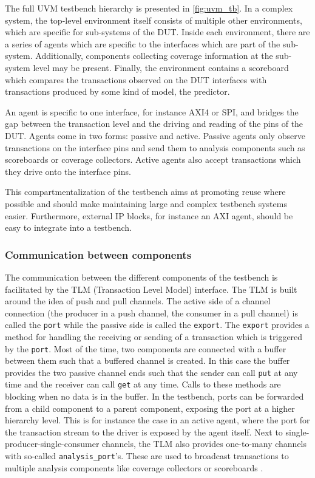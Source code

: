 \documentclass[12pt]{report}
\newcommand{\ttt}{\texttt}
\begin{document}
The full UVM testbench hierarchy is presented in \ref{fig:uvm_tb}. In a complex system, the top-level environment
itself consists of
multiple other environments, which are specific for sub-systems of the DUT. Inside each environment, there are a
series of agents which are specific to the interfaces which are part of the sub-system. Additionally, components
collecting coverage information at the sub-system level may be present. Finally, the environment contains a
scoreboard which compares the transactions observed on the DUT interfaces with transactions produced by some kind of
model, the predictor.

An agent is specific to one interface, for instance AXI4 or SPI, and bridges the gap between the transaction level
and the driving and reading of the pins of the DUT. Agents come in two forms: passive and active. Passive agents only
observe transactions on the interface pins and send them to analysis components such as scoreboards or coverage
collectors. Active agents also accept transactions which they drive onto the interface pins.

This compartmentalization of the testbench aims at promoting reuse where possible and should make maintaining large
and complex testbench systems easier. Furthermore, external IP blocks, for instance an AXI agent, should be easy to
integrate into a testbench.

\subsubsection{Communication between components} %

The communication between the different components of the testbench is facilitated by the TLM (Transaction Level
Model) interface. The TLM is built around the idea of push and pull channels. The active side of a channel connection
(the producer in a push channel, the consumer in a pull channel) is called the \ttt{port} while the passive side is
called the \ttt{export}. The \ttt{export} provides a method for handling the receiving or sending of a transaction
which is triggered by the \ttt{port}. Most of the time, two components are connected with a buffer between them such
that a buffered channel is created. In this case the buffer provides the two passive channel ends such that the
sender can call \ttt{put} at any time and the receiver can call \ttt{get} at any time. Calls to these methods are
blocking when no data is in the buffer. In the testbench, ports can be forwarded from a child component to a parent
component, exposing the port at a higher hierarchy level. This is for instance the case in an active agent, where the
port for the transaction stream to the driver is exposed by the agent itself. Next to single-producer-single-consumer
channels, the TLM also provides one-to-many channels with so-called \ttt{analysis\_port}'s. These are used to
broadcast transactions to multiple analysis components like coverage collectors or scoreboards \cite[ch. 4.5]{mehta2018asic}.
\end{document}
